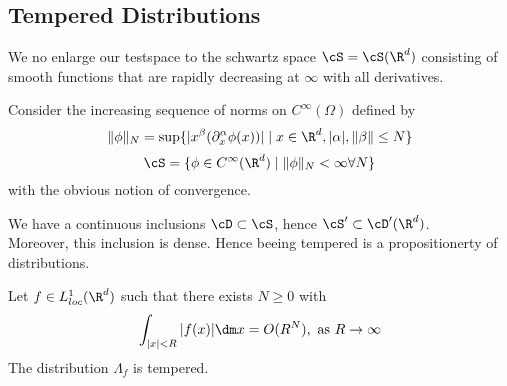 	\subsection{Tempered Distributions}
	We no enlarge our testspace to the schwartz space $\cS = \cS(\R^d)$ consisting of smooth functions that are rapidly decreasing at $\infty$ with all derivatives. 
	\begin{definition}
		Consider the increasing sequence of norms on $C^\infty(\Omega)$ defined by
		\[
		\|\phi\|_N = \sup \{ | x^\beta (\partial_x^\alpha \phi(x)) | \mid x \in \R^d , |\alpha|,\|\beta\|\le N\}
		\]
		\[
		\cS = \{\phi \in C^\infty(\R^d) \mid \|\phi\|_N < \infty \forall N\}
		\]
		with the obvious notion of convergence.
	\end{definition}
	\begin{lemma}
		We have a continuous inclusions $\cD \subset \cS$, hence $\cS' \subset \cD'(\R^d)$. \\
		Moreover, this inclusion is dense. Hence beeing tempered is a propositionerty of distributions. %
	\end{lemma}
	\begin{lemma}{\label{slowlyInc}}
		Let $f \in L^1_{loc}(\R^d)$ such that there exists $N \ge 0$ with
		\[
		\int_{|x| < R} |f(x)| \dm x = O(R^N) , \text{ as } R \to \infty
		\]
		The distribution $\Lambda_f$ is tempered.    
	\end{lemma}
	
